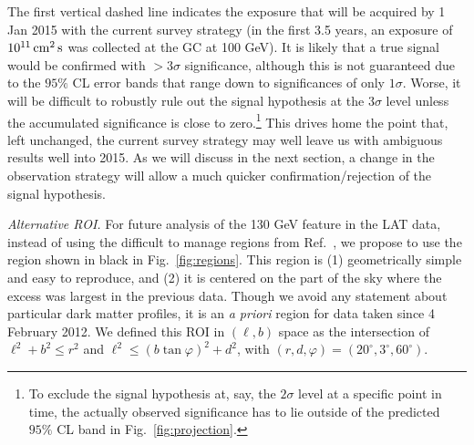\documentclass[aps,prd,superscriptaddress,nofootinbib,fixlfloat, 12pt]{revtex4-1}
\begin{document}
The first vertical dashed line indicates the exposure that will be acquired by
1 Jan 2015 with the current survey strategy (in the first 3.5 years, an
exposure of $10^{11}\rm\,cm^2\,s$ was collected at the GC at 100 GeV). It is likely that a true signal
would be confirmed with $>3\sigma$ significance, although this is not
guaranteed due to the $95\%$ CL error bands that range down to significances
of only $1\sigma$. Worse, it will be difficult to robustly rule out the signal
hypothesis at the $3\sigma$ level unless the accumulated significance is close
to zero.\footnote{To exclude the signal hypothesis at, say, the $2\sigma$ level at a
specific point in time, the actually observed significance has to lie outside
of the predicted
$95\%$ CL band in Fig.~\ref{fig:projection}.} This drives home the point
that, left unchanged, the current survey
strategy may well leave us with ambiguous results well into 2015.  As we will
discuss in the next section, a change in the observation strategy will allow a
much quicker confirmation/rejection of the signal hypothesis.
\medskip

\emph{Alternative ROI.} For future analysis of the 130 GeV feature in the LAT
data, instead of using the difficult to manage regions from
Ref.~\cite{Weniger:2012}, we propose to use the region shown in black in
Fig.~\ref{fig:regions}. This region is (1) geometrically simple and easy to reproduce, and (2)
it is centered on the part of the sky where the excess was largest in the
previous data. Though we avoid any statement about particular dark matter
profiles, it is an \emph{a priori} region for data taken since 4 February
2012. We defined this ROI in $(\ell, b)$ space as the intersection of
$\ell^2+b^2\leq
r^2$ and $\ell^2\leq (b\tan\varphi)^2 + d^2$, with $(r, d, \varphi) =
(20^\circ, 3^\circ, 60^\circ)$. 
\end{document}
